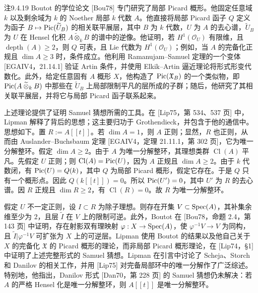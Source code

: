 \begin{origstatement}{注}{9.4.19}
Boutot 的学位论文 [Bou78] 专门研究了局部 Picard 概形。他固定任意域 $k$ 以及剩余域为 $k$ 的 Noether 局部 $k$ 代数 $A$。他直接将局部 Picard 函子 $Q$ 定义为函子 $B\mapsto\operatorname{Pic}(\widetilde U_B)$ 的相关联平展层，其中 $B$ 为 $k$ 代数，$U$ 为 $A$ 的去心谱，$\widetilde U_B$ 为 $U$ 在 Hensel 化积 $A\mathbin{\widetilde\otimes}_k B$ 的谱中的逆像。他证明，若 $H^1(\mathcal O_U)$ 有限维，且 $\operatorname{depth}(A)\geq2$，则 $Q$ 可表，且 Lie 代数为 $H^1(\mathcal O_U)$；例如，当 $A$ 的完备化正规且 $\dim A\geq3$ 时，条件成立。他利用 Ramanujam--Samuel 定理的一个变体 [EGAIV4，21.14.1] 验证 Artin 条件，并使用 Elkik--Artin 逼近理论将形式形变代数化。此外，给定任意固有 $A$ 概形 $X$，他构造了 $\operatorname{Pic}(\mathfrak X_B)$ 的一个类似物，即 $\operatorname{Pic}(A\mathbin{\widetilde\otimes}_kB)$ 中那些在 $\widetilde U_B$ 上局部限制平凡的层所成的子群；随后，他研究了其相关联平展层，并将它与局部 Picard 函子联系起来。

上述理论提供了证明 Samuel 猜想所需的工具。在 [Lip75，第 534、537 页] 中，Lipman 解释了背后的思想；这主要归功于 Grothendieck，并包含于他的通信中。思想如下。置 $R:=A[[t]]$。若 $\dim A=1$，则 $A$ 正则；显然，$R$ 也正则，从而由 Auslander--Buchsbaum 定理 [EGAIV4，定理 21.11.1，第 302 页]，它为唯一分解整环。假定 $\dim A\geq2$。由于 $A$ 为唯一分解整环，其理想类群 $\operatorname{Cl}(A)$ 平凡。先假定 $U$ 正则；则 $\operatorname{Cl}(A)=\operatorname{Pic}(U)$，因为 $A$ 正规且 $\dim A\geq2$。由于 $k$ 代数闭，有 $\operatorname{Pic}(U)=Q(k)$，其中 $Q$ 为局部 Picard 概形，假定它存在。于是 $Q$ 只有一个概形点。因此 $Q(k[[t]])=0$。所以 $\operatorname{Pic}(U')=0$，其中 $U'$ 为 $R$ 的去心谱。因 $R$ 正规且 $\dim R\geq2$，有 $\operatorname{Cl}(R)=0$。故 $R$ 为唯一分解整环。

假定 $U$ 不一定正则，设 $I\subset R$ 为除子理想。则存在开集 $V\subset\operatorname{Spec}(A)$，其补集余维至少为 $2$，且层 $\widetilde I$ 在 $V$ 上的限制可逆。此外，Boutot 在 [Bou78，命题 2.4，第 143 页] 中证明，存在射影双有理映射 $\varphi:X\to\operatorname{Spec}(A)$，使 $\varphi^{-1}V\to V$ 为同构，且 $\widetilde I|\varphi^{-1}V$ 可扩张为 $X$ 上的可逆层。Lipman 使用 Boutot 的结果以及他自己关于 $X$ 的完备化 $\mathfrak X$ 的 Picard 概形的理论，而非局部 Picard 概形理论，在 [Lip74，§1] 中证明了上述完整形式的 Samuel 猜想。Lipman 在引言中讨论了 Scheja、Storch 和 Danilov 的相关工作，并用 [Lip75] 对完备局部环中的唯一分解作了广泛综述。特别地，他指出，Danilov 形式 [Dan70，第 228 页] 的 Samuel
猜想仍未解决：若 $A$ 的严格 Hensel 化是唯一分解整环，则 $A[[t]]$ 是唯一分解整环。


\end{origstatement}
